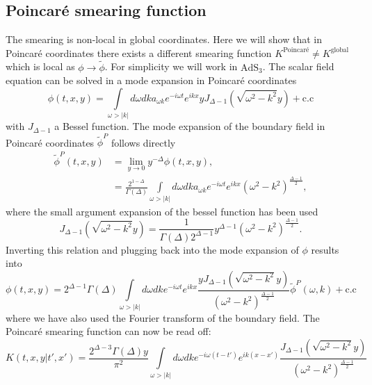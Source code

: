 \documentclass{PoS}
\newcommand{\LF}{\left(}
\newcommand{\RF}{\right)}
\begin{document}
\begin{appendix}
\section{Poincar\'e smearing function}
\label{sec:app1}
The smearing is non-local in global coordinates. Here we will show that in Poincar\'e coordinates there exists a different smearing function $K^{\text{Poincar\'e}}\neq K^{\text{global}}$ which is local as $\phi\rightarrow \tilde{\phi}$. For simplicity we will work in $\text{AdS}_3$. The scalar field equation can be solved in a mode expansion in Poincar\'e coordinates
\begin{equation}
\phi(t,x,y) = \int\limits_{\omega> \left|k\right|} d\omega dk a_{\omega k } e^{-i\omega t} e^{ikx} y J_{\Delta-1}\LF \sqrt{\omega^2-k^2}y\RF + \text{c.c}
\end{equation}
with $J_{\Delta-1}$ a Bessel function. The mode expansion of the boundary field in Poincar\'e coordinates $\tilde{\phi}^P$ follows directly
\begin{align}
\tilde{\phi}^{P}(t,x,y) &= \lim\limits_{y\rightarrow 0} y^{-\Delta} \phi(t,x,y),\\
&= \frac{2^{1-\Delta}}{\Gamma\LF\Delta\RF}\int\limits_{\omega>\left|k\right|} d\omega dk a_{\omega k} e^{-i\omega t} e^{ikx}\LF \omega^2-k^2\RF^{\frac{\Delta-1}{2}},
\end{align}
where the small argument expansion of the bessel function has been used
\begin{equation}
J_{\Delta-1} (\sqrt{\omega^2-k^2}y) = \frac{ 1}{\Gamma(\Delta)2^{\Delta-1}} y^{\Delta-1} \LF \omega^2-k^2\RF^{\frac{\Delta-1}{2}}.
\end{equation}
Inverting this relation and plugging back into the mode expansion of $\phi$ results into
\begin{equation}
\phi(t,x,y) = 2^{\Delta-1} \Gamma\LF \Delta\RF \int\limits_{\omega>\left|k\right|} d\omega dk e^{-i\omega t}e^{ikx} \frac{y J_{\Delta-1}\LF \sqrt{\omega^2-k^2}y\RF}{\LF \omega^2-k^2\RF^{\frac{\Delta-1}{2}}}\tilde{\phi}^P(\omega,k) + \text{c.c}
\label{eq:scalPoincare}
\end{equation}
where we have also used the Fourier transform of the boundary field. The Poincar\'e smearing function can now be read off:
\begin{equation}
K(\left. t,x,y\right| t',x') = \frac{2^{\Delta-3}\Gamma\LF \Delta\RF y}{\pi^2} \int\limits_{\omega>\left|k\right|} d\omega dk e^{-i\omega (t-t')} e^{ik(x-x')} \frac{ J_{\Delta-1}\LF \sqrt{\omega^2-k^2}y\RF}{\LF \omega^2-k^2\RF^{\frac{\Delta-1}{2}}}

\end{equation}
\end{appendix}
\end{document}
